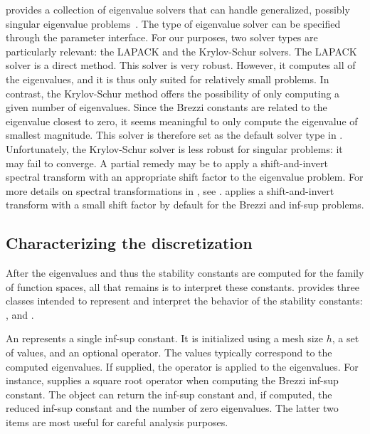 \slepc{} provides a collection of eigenvalue solvers that can handle
generalized, possibly singular eigenvalue
problems~\citep{HernandezRomanVidal2005,
HernandezRomanRomeroEtAl2009}. The type of eigenvalue solver can be
specified through the \dolfin{} parameter interface. For our purposes,
two solver types are particularly relevant: the LAPACK and the
Krylov-Schur solvers.  The LAPACK solver is a direct method. This
solver is very robust. However, it computes all of the eigenvalues,
and it is thus only suited for relatively small problems. In contrast,
the Krylov-Schur method offers the possibility of only computing a
given number of eigenvalues. Since the Brezzi constants are related to
the eigenvalue closest to zero, it seems meaningful to only compute
the eigenvalue of smallest magnitude. This solver is therefore set as
the default solver type in
\rognesascot. Unfortunately, the Krylov-Schur solver is less robust
for singular problems: it may fail to converge. A partial remedy may
be to apply a shift-and-invert spectral transform with an appropriate
shift factor to the eigenvalue problem. For more details on spectral
transformations in \slepc{}, see
\citet{HernandezRomanRomeroEtAl2009}. \rognesascot{} applies a
shift-and-invert transform with a small shift factor by default for
the Brezzi and \babuska{} inf-sup problems.

\subsection{Characterizing the discretization}

After the eigenvalues and thus the stability constants are computed
for the family of function spaces, all that remains is to interpret
these constants. \rognesascot{} provides three classes intended to represent
and interpret the behavior of the stability constants:
,  and
.

An  represents a single inf-sup constant. It is
initialized using a mesh size $h$, a set of values, and an optional
operator. The values typically correspond to the computed
eigenvalues. If supplied, the operator is applied to the eigenvalues.
For instance, \rognesascot{} supplies a square root operator when
computing the Brezzi inf-sup constant. The object can return the
inf-sup constant and, if computed, the reduced inf-sup constant and
the number of zero eigenvalues. The latter two items are most useful
for careful analysis purposes.

